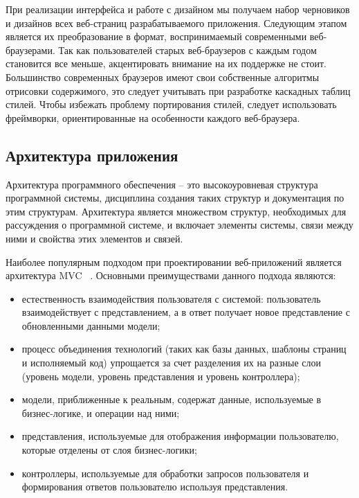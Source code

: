 При реализации интерфейса и работе с дизайном мы получаем набор черновиков и дизайнов всех веб-страниц разрабатываемого приложения. Следующим этапом является их преобразование в формат, воспринимаемый современными веб-браузерами. Так как пользователей старых веб-браузеров с каждым годом становится все меньше, акцентировать внимание на их поддержке не стоит. Большинство современных браузеров имеют свои собственные алгоритмы отрисовки содержимого, это следует учитывать при разработке каскадных таблиц стилей. Чтобы избежать проблему портирования стилей, следует использовать фреймворки, ориентированные на особенности каждого веб-браузера.


\subsection{Архитектура приложения}
\label{sub:domain:manual_structure}
Архитектура программного обеспечения -- это высокоуровневая структура программной системы, дисциплина создания таких структур и документация по этим структурам. Архитектура является множеством структур, необходимых для рассуждения о программной системе, и включает элементы системы, связи между ними и свойства этих элементов и связей.

Наиболее популярным подходом при проектировании веб-приложений является архитектура MVC ~\cite{mvc}. Основными преимуществами данного подхода являются:

\begin{itemize}
  \item естественность взаимодействия пользователя с системой: пользователь взаимодействует с представлением, а в ответ получает новое представление с обновленными данными модели;
  \item процесс объединения технологий (таких как базы данных, шаблоны страниц и исполняемый код) упрощается за счет разделения их на разные слои (уровень модели, уровень представления и уровень контроллера);
  \item модели, приближенные к реальным, содержат данные, используемые в бизнес-логике, и операции над ними;
  \item представления, используемые для отображения информации пользователю, которые отделены от слоя бизнес-логики;
  \item контроллеры, используемые для обработки запросов пользователя и формирования ответов пользователю используя представления.
\end{itemize}

